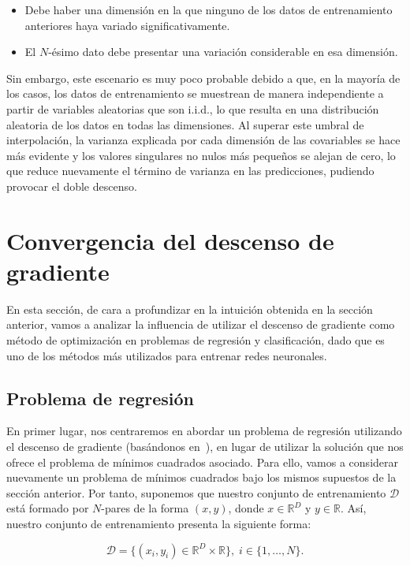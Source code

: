 \begin{itemize}
    \item Debe haber una dimensión en la que ninguno de los datos de entrenamiento anteriores haya variado significativamente.
    \item El $N$-ésimo dato debe presentar una variación considerable en esa dimensión.
\end{itemize}

Sin embargo, este escenario es muy poco probable debido a que, en la mayoría de los casos, los datos de entrenamiento se muestrean de manera independiente a partir de variables aleatorias que son i.i.d., lo que resulta en una distribución aleatoria de los datos en todas las dimensiones. Al superar este umbral de interpolación, la varianza explicada por cada dimensión de las covariables se hace más evidente y los valores singulares no nulos más pequeños se alejan de cero, lo que reduce nuevamente el término de varianza en las predicciones, pudiendo provocar el doble descenso.

\section{Convergencia del descenso de gradiente}\label{sec:sesgo-implicito-descenso-gradiente}

En esta sección, de cara a profundizar en la intuición obtenida en la sección anterior, vamos a analizar la influencia de utilizar el descenso de gradiente como método de optimización en problemas de regresión y clasificación, dado que es uno de los métodos más utilizados para entrenar redes neuronales.

\subsection{Problema de regresión}\label{subsec:problema-regresion}
En primer lugar, nos centraremos en abordar un problema de regresión utilizando el descenso de gradiente (basándonos en~\cite{Lafon2024}), en lugar de utilizar la solución que nos ofrece el problema de mínimos cuadrados asociado. Para ello, vamos a considerar nuevamente un problema de mínimos cuadrados bajo los mismos supuestos de la sección anterior. Por tanto, suponemos que nuestro conjunto de entrenamiento $\mathcal{D}$ está formado por $N$-pares de la forma $(x, y)$, donde $x \in \mathbb{R}^{D}$ y $y \in \mathbb{R}$. Así, nuestro conjunto de entrenamiento presenta la siguiente forma:

\[
    \mathcal{D} = \{ (x_i, y_i) \in \mathbb{R}^{D} \times \mathbb{R} \}, \; i \in \{ 1, \ldots, N \}.
\]

